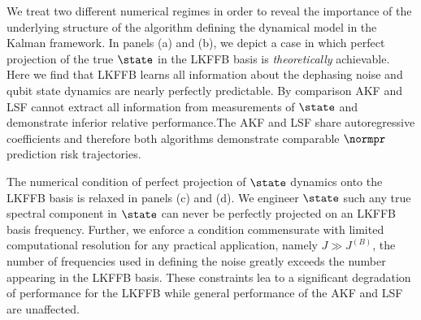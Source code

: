 We treat two different numerical regimes in order to reveal the importance of the underlying structure of the algorithm defining the dynamical model in the Kalman framework.  In panels (a) and (b), we depict a case in which perfect projection of the true $\state$ in the LKFFB basis is \textit{theoretically} achievable.  Here we find that LKFFB learns all information about the dephasing noise and qubit state dynamics are nearly perfectly predictable.  By comparison AKF and LSF cannot extract all information from measurements of $\state$ and demonstrate inferior relative performance.The AKF and LSF share autoregressive coefficients and therefore both algorithms demonstrate comparable $\normpr$ prediction risk trajectories. 

The numerical condition of perfect projection of $\state$ dynamics onto the LKFFB basis is relaxed in panels (c) and (d).  We engineer $\state$ such any true spectral component in $\state$ can never be perfectly projected on an LKFFB basis frequency. Further, we enforce a condition commensurate with limited computational resolution for any practical application, namely $J \gg J^{(B)}$, the number of frequencies used in defining the noise greatly exceeds the number appearing in the LKFFB basis.  These constraints lea to a significant degradation of performance for the LKFFB while general performance of the AKF and LSF are unaffected. 

